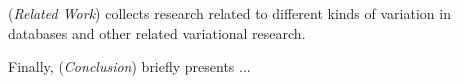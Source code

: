

 (\emph{Related Work}) collects research related to different kinds of variation 
in databases and other related variational research. 

Finally,  (\emph{Conclusion}) briefly presents ...

